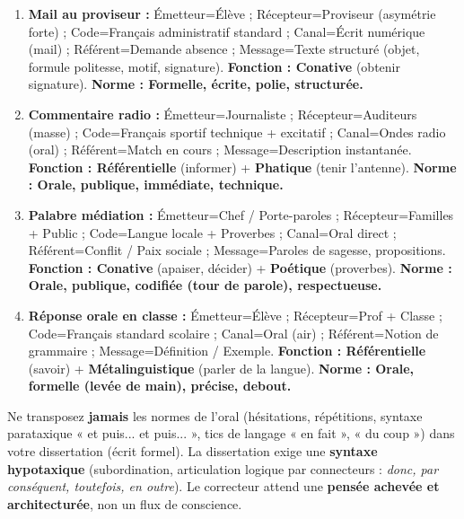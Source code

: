 \documentclass[11pt]{article}
\begin{document}
\begin{corrige}
\begin{enumerate}
    \item \textbf{Mail au proviseur :} Émetteur=Élève ; Récepteur=Proviseur (asymétrie forte) ; Code=Français administratif standard ; Canal=Écrit numérique (mail) ; Référent=Demande absence ; Message=Texte structuré (objet, formule politesse, motif, signature). \textbf{Fonction : Conative} (obtenir signature). \textbf{Norme : Formelle, écrite, polie, structurée.}
    \item \textbf{Commentaire radio :} Émetteur=Journaliste ; Récepteur=Auditeurs (masse) ; Code=Français sportif technique + excitatif ; Canal=Ondes radio (oral) ; Référent=Match en cours ; Message=Description instantanée. \textbf{Fonction : Référentielle} (informer) + \textbf{Phatique} (tenir l'antenne). \textbf{Norme : Orale, publique, immédiate, technique.}
    \item \textbf{Palabre médiation :} Émetteur=Chef / Porte-paroles ; Récepteur=Familles + Public ; Code=Langue locale + Proverbes ; Canal=Oral direct ; Référent=Conflit / Paix sociale ; Message=Paroles de sagesse, propositions. \textbf{Fonction : Conative} (apaiser, décider) + \textbf{Poétique} (proverbes). \textbf{Norme : Orale, publique, codifiée (tour de parole), respectueuse.}
    \item \textbf{Réponse orale en classe :} Émetteur=Élève ; Récepteur=Prof + Classe ; Code=Français standard scolaire ; Canal=Oral (air) ; Référent=Notion de grammaire ; Message=Définition / Exemple. \textbf{Fonction : Référentielle} (savoir) + \textbf{Métalinguistique} (parler de la langue). \textbf{Norme : Orale, formelle (levée de main), précise, debout.}
\end{enumerate}
\end{corrige}

\begin{attention}
Ne transposez \textbf{jamais} les normes de l'oral (hésitations, répétitions, syntaxe parataxique « et puis... et puis... », tics de langage « en fait », « du coup ») dans votre dissertation (écrit formel). La dissertation exige une \textbf{syntaxe hypotaxique} (subordination, articulation logique par connecteurs : \emph{donc, par conséquent, toutefois, en outre}). Le correcteur attend une \textbf{pensée achevée et architecturée}, non un flux de conscience.
\end{attention}
\end{document}
